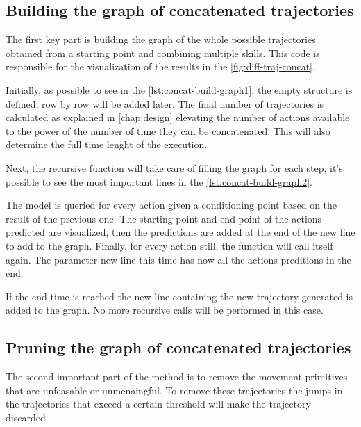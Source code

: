 \subsection{Building the graph of concatenated trajectories} 
The first key part is building the graph of the whole possible trajectories obtained from a starting point and combining multiple skills. This code is responsible for the visualization of the results in the \cref{fig:diff-traj-concat}. 

Initially, as possible to see in the \cref{lst:concat-build-graph1}, the empty structure is defined, row by row will be added later. The final number of trajectories is calculated as explained in \cref{chap:design} elevating the number of actions available to the power of the number of time they can be concatenated. This will also determine the full time lenght of the execution. 



Next, the recursive function will take care of filling the graph for each step, it's possible to see the most important lines in the \cref{lst:concat-build-graph2}. 

The model is queried for every action given a conditioning point based on the result of the previous one. The starting point and end point of the actions predicted are visualized, then the predictions are added at the end of the new line to add to the graph. Finally, for every action still, the function will call itself again. The parameter new line this time has now all the actions preditions in the end. 



If the end time is reached the new line containing the new trajectory generated is added to the graph. No more recursive calls will be performed in this case.

\subsection{Pruning the graph of concatenated trajectories}
The second important part of the method is to remove the movement primitives that are unfeasable or unmenaingful. To remove these trajectories the jumps in the trajectories that exceed a certain threshold will make the trajectory discarded.

